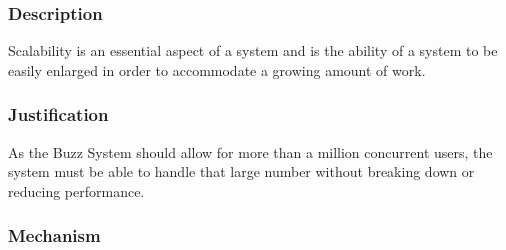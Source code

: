 	\subsubsection*{Description}
	Scalability is an essential aspect of a system and is the ability of a system to be easily enlarged in order to accommodate a growing amount of work.
	\subsubsection*{Justification}
	 As the Buzz System should allow for more than a million concurrent users, the system must be able to handle that large number without breaking down or reducing performance.
	\subsubsection*{Mechanism}
